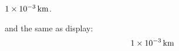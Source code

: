 \documentclass[review,number,sort&compress]{elsarticle}
\begin{document}
$\unit[1 \times 10^{-3}]{km}$.

and the same as display:
\begin{displaymath}
\unit[1 \times 10^{-3}]{km}
\end{displaymath}
\end{document}
